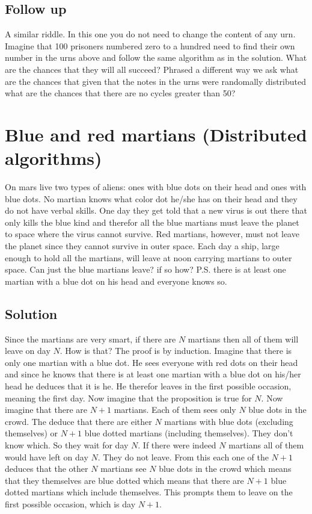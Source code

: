 \documentclass{article}
\begin{document}
\subsection{Follow up}
A similar riddle. In this one you do not need to change the content of any urn. Imagine that 100 prisoners numbered zero to a hundred need to find their own number in the urns above and follow the same algorithm as in the solution. What are the chances that they will all succeed? Phrased a different way we ask what are the chances that given that the notes in the urns were randomally distributed what are the chances that there are no cycles greater than 50?

\section{Blue and red martians (Distributed algorithms)}
On mars live two types of aliens: ones with blue dots on their head and ones with blue dots. No martian knows what color dot he/she has on their head and they do not have verbal skills. One day they get told that a new virus is out there that only kills the blue kind and therefor all the blue martians must leave the planet to space where the virus cannot survive. Red martians, however, must not leave the planet since they cannot survive in outer space. Each day a ship, large enough to hold all the martians, will leave at noon carrying martians to outer space. Can just the blue martians leave? if so how? P.S. there is at least one martian with a blue dot on his head and everyone knows so.

\subsection{Solution}
Since the martians are very smart, if there are $N$ martians then all of them will leave on day $N$. How is that? The proof is by induction. Imagine that there is only one martian with a blue dot. He sees everyone with red dots on their head and since he knows that there is at least one martian with a blue dot on his/her head he deduces that it is he. He therefor leaves in the first possible occasion, meaning the first day. Now imagine that the proposition is true for $N$. Now imagine that there are $N+1$ martians. Each of them sees only $N$ blue dots in the crowd. The deduce that there are either $N$ martians with blue dots (excluding themselves) or $N+1$ blue dotted martians (including themselves). They don't know which. So they wait for day $N$. If there were indeed $N$ martians all of them would have left on day $N$. They do not leave. From this each one of the $N+1$ deduces that the other $N$ martians see $N$ blue dots in the crowd which means that they themselves are blue dotted which means that there are $N+1$ blue dotted martians which include themselves. This prompts them to leave on the first possible occasion, which is day $N+1$.
\end{document}
